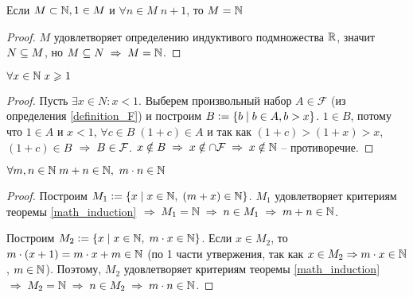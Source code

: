 \begin{theorem} \label{math_induction}
    Если $ M \subset \mathbb{N}, 1 \in M $\! и $ \forall n \in M \; n + 1 $, то $ M = \mathbb{N} $
\end{theorem} \begin{proof}
    $ M $ удовлетворяет определению индуктивого подмножества $ \mathbb{R} $, значит $ N \subseteq M $, но $ M \sub N \thus M = \N$.
\end{proof}
\begin{theorem}
    $ \forall x \in \mathbb{N} \; x \geqslant 1 $
\end{theorem}
\begin{proof}
    Пусть $\exists x \in N : x < 1$. Выберем произвольный набор $A \in \mathcal{F}$ (из определения \ref{definition_F}) и построим $B \vcentcolon= \{b \;\vert\; b \in A, b > x\}$. $1 \in B$, потому что $1 \in A$ и $x < 1$, $\forall c \in B \; (1 + c) \in A$ и так как $(1 + c) > (1 + x) > x$, $(1 + c) \in B$ $\thus B \in \mathcal{F}$. $x \notin B \thus x \notin \cap \mathcal{F} \thus  x \notin \N$ -- противоречие.
\end{proof}
\begin{theorem}
    $ \forall m, n \in \mathbb{N} \; m + n \in \mathbb{N},\ m \cdot n \in \mathbb{N}$
\end{theorem}
\begin{proof}
    Построим $M_1 \vcentcolon= \{x \;\vert\; x \in \mathbb{N},\; (m + x) \in \mathbb{N}\}$. $M_1$ удовлетворяет критериям теоремы \ref{math_induction} $\thus M_1 = \N \thus n \in M_1 \thus m + n \in \N$.

    Построим $M_2 \vcentcolon= \{x \;\vert\; x \in \mathbb{N},\; m \cdot x \in \mathbb{N}\}$. Если $x \in M_2$, то $m \cdot (x + 1) = m \cdot x + m \in \mathbb{N}$ (по 1 части утвержения, так как $x \in M_2 \Rightarrow m \cdot x \in \mathbb{N}$, $m \in \mathbb{N}$). Поэтому, $M_2$ удовлетворяет критериям теоремы \ref{math_induction} $\thus M_2 = \N \thus n \in M_2 \thus m \cdot n \in \N$.
\end{proof}
